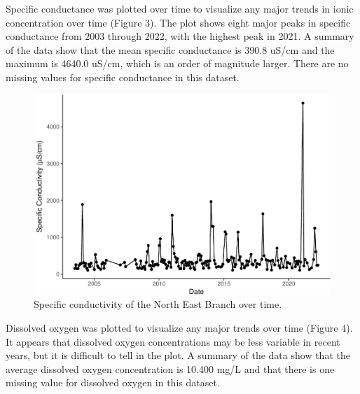 \documentclass[
  12pt,
]{article}
\begin{document}
\newpage

Specific conductance was plotted over time to visualize any major trends
in ionic concentration over time (Figure 3). The plot shows eight major
peaks in specific conductance from 2003 through 2022, with the highest
peak in 2021. A summary of the data show that the mean specific
conductance is 390.8 uS/cm and the maximum is 4640.0 uS/cm, which is an
order of magnitude larger. There are no missing values for specific
conductance in this dataset.

\begin{figure}

\includegraphics{Project_Template_files/figure-latex/Specific conductivity over time-1} \hfill{}

\caption{Specific conductivity of the North East Branch over time.}\label{fig:Specific conductivity over time}
\end{figure}

\newpage

Dissolved oxygen was plotted to visualize any major trends over time
(Figure 4). It appears that dissolved oxygen concentrations may be less
variable in recent years, but it is difficult to tell in the plot. A
summary of the data show that the average dissolved oxygen concentration
is 10.400 mg/L and that there is one missing value for dissolved oxygen
in this dataset.
\end{document}
